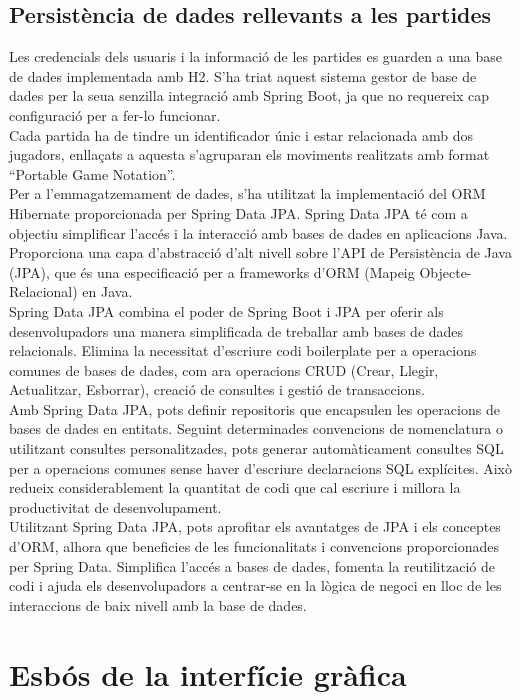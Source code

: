 \subsection{Persistència de dades rellevants a les partides}
Les credencials dels usuaris i la informació de les partides es guarden a una base de dades implementada amb H2. S'ha triat aquest sistema gestor de base de dades per la seua senzilla integració amb Spring Boot, ja que no requereix cap configuració per a fer-lo funcionar.
\\[3mm]
Cada partida ha de tindre un identificador únic i estar relacionada amb dos jugadors, enllaçats a aquesta s’agruparan els moviments realitzats amb format “Portable Game Notation”.
\\[3mm]
Per a l'emmagatzemament de dades, s'ha utilitzat la implementació del ORM Hibernate proporcionada per Spring Data JPA. Spring Data JPA té com a objectiu simplificar l'accés i la interacció amb bases de dades en aplicacions Java. Proporciona una capa d'abstracció d'alt nivell sobre l'API de Persistència de Java (JPA), que és una especificació per a frameworks d'ORM (Mapeig Objecte-Relacional) en Java.
\\[3mm]
Spring Data JPA combina el poder de Spring Boot i JPA per oferir als desenvolupadors una manera simplificada de treballar amb bases de dades relacionals. Elimina la necessitat d'escriure codi boilerplate per a operacions comunes de bases de dades, com ara operacions CRUD (Crear, Llegir, Actualitzar, Esborrar), creació de consultes i gestió de transaccions.
\\[3mm]
Amb Spring Data JPA, pots definir repositoris que encapsulen les operacions de bases de dades en entitats. Seguint determinades convencions de nomenclatura o utilitzant consultes personalitzades, pots generar automàticament consultes SQL per a operacions comunes sense haver d'escriure declaracions SQL explícites. Això redueix considerablement la quantitat de codi que cal escriure i millora la productivitat de desenvolupament.
\\[3mm]
Utilitzant Spring Data JPA, pots aprofitar els avantatges de JPA i els conceptes d'ORM, alhora que beneficies de les funcionalitats i convencions proporcionades per Spring Data. Simplifica l'accés a bases de dades, fomenta la reutilització de codi i ajuda els desenvolupadors a centrar-se en la lògica de negoci en lloc de les interaccions de baix nivell amb la base de dades.
\section{Esbós de la interfície gràfica}
